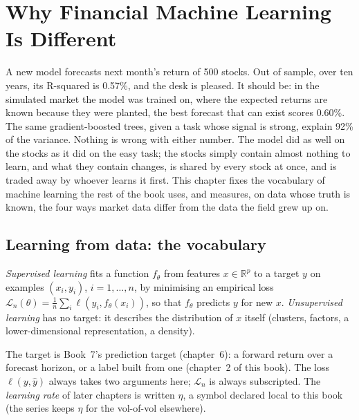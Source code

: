 \chapter{Why Financial Machine Learning Is Different}\label{ch:ml:why-financial-machine-learning-is-different}

A new model forecasts next month's return of 500 stocks. Out of sample, over ten years, its R-squared is 0.57\%, and
the desk is pleased. It should be: in the simulated market the model was trained on, where the expected returns are
known because they were planted, the best forecast that can exist scores 0.60\%. The same gradient-boosted trees,
given a task whose signal is strong, explain 92\% of the variance. Nothing is wrong with either number. The model
did as well on the stocks as it did on the easy task; the stocks simply contain almost nothing to learn, and what they
contain changes, is shared by every stock at once, and is traded away by whoever learns it first. This chapter fixes
the vocabulary of machine learning the rest of the book uses, and measures, on data whose truth is known, the four
ways market data differ from the data the field grew up on.

\section{Learning from data: the vocabulary}

\begin{definition}\label{def:ml:why-financial-machine-learning-is-different:learning}
\emph{Supervised learning} fits a function $f_\theta$ from features $x\in\mathbb R^p$ to
a target $y$ on examples $(x_i, y_i)$, $i = 1,\dots,n$, by minimising an empirical loss
$\mathcal L_n(\theta) = \frac1n\sum_i\ell(y_i, f_\theta(x_i))$, so that $f_\theta$ predicts $y$ for new $x$.
\emph{Unsupervised learning} has no target: it describes the distribution of $x$ itself
(clusters, factors, a lower-dimensional representation, a density).
\end{definition}

The target is Book~7's prediction target (chapter~6): a forward return over a forecast horizon, or a label built from
one (chapter~2 of this book). The loss $\ell(y,\hat y)$ always takes two
arguments here; $\mathcal L_n$ is always subscripted. The \emph{learning rate} of later chapters is written $\eta$,
a symbol declared local to this book (the series keeps $\eta$ for the vol-of-vol elsewhere).

